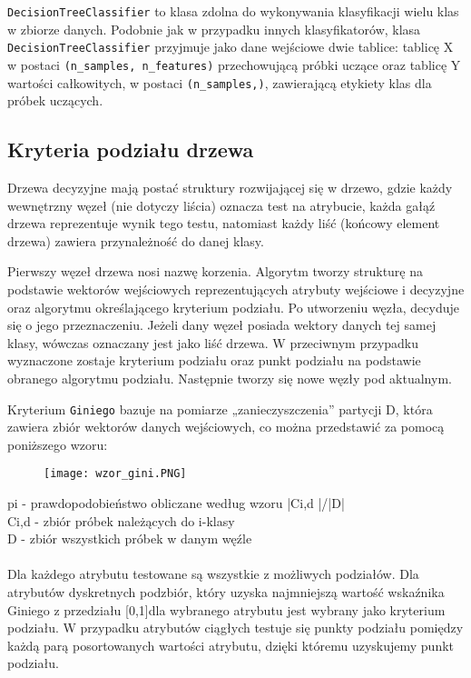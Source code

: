 \documentclass{article}
\begin{document}
\texttt{DecisionTreeClassifier} to klasa zdolna do wykonywania klasyfikacji wielu klas w zbiorze danych. Podobnie jak w przypadku innych klasyfikatorów, klasa \texttt{DecisionTreeClassifier} przyjmuje jako dane wejściowe dwie tablice: tablicę X w postaci \texttt{(n\_samples, n\_features)} przechowującą próbki uczące oraz tablicę Y wartości całkowitych, w postaci \texttt{(n\_samples,)}, zawierającą etykiety klas dla próbek uczących.


\newpage
\subsection{Kryteria podziału drzewa}
\quad Drzewa decyzyjne mają postać struktury rozwijającej się w drzewo, gdzie każdy wewnętrzny węzeł (nie dotyczy liścia) oznacza test na atrybucie, każda gałąź drzewa reprezentuje wynik tego testu, natomiast każdy liść (końcowy element drzewa) zawiera przynależność do danej klasy. 

Pierwszy węzeł drzewa nosi nazwę korzenia. Algorytm tworzy strukturę na podstawie wektorów wejściowych reprezentujących atrybuty wejściowe i decyzyjne oraz algorytmu określającego kryterium podziału. Po utworzeniu węzła, decyduje się o jego przeznaczeniu. Jeżeli dany węzeł posiada wektory danych tej samej klasy, wówczas oznaczany jest jako liść drzewa. W przeciwnym przypadku wyznaczone zostaje kryterium podziału oraz punkt podziału na podstawie obranego algorytmu podziału. Następnie tworzy się nowe węzły pod aktualnym. 

Kryterium \texttt{Giniego} bazuje na pomiarze „zanieczyszczenia” partycji D, która zawiera zbiór wektorów danych wejściowych, co można przedstawić za pomocą poniższego wzoru: 
\begin{figure}[ht]
    \centering
    \noindent 
    \vspace{.2cm}
    \texttt{[image: wzor\_gini.PNG]}
    \label{fig:gini}
\end{figure}

p{\tiny i} - prawdopodobieństwo obliczane według wzoru |C{\tiny i,d} |/|D| \\
C{\tiny i,d} - zbiór próbek należących do i-klasy\\
D - zbiór wszystkich próbek w danym węźle\\\\

Dla każdego atrybutu testowane są wszystkie z możliwych podziałów. Dla atrybutów dyskretnych podzbiór,  który uzyska najmniejszą wartość wskaźnika Giniego z przedziału [0,1]dla wybranego atrybutu jest wybrany jako kryterium podziału. W przypadku atrybutów ciągłych testuje się punkty podziału pomiędzy każdą parą posortowanych wartości atrybutu, dzięki któremu uzyskujemy punkt podziału.
\end{document}
